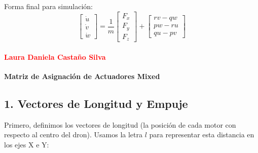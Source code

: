 \documentclass[11pt,a4paper]{article}
\begin{document}
Forma final para simulación:
\begin{equation}
\boxed{
\begin{bmatrix}\dot{u}\\[2pt]\dot{v}\\[2pt]\dot{w}\end{bmatrix}
=\frac{1}{m}\begin{bmatrix}F_{x}\\[2pt]F_{y}\\[2pt]F_{z}\end{bmatrix}
+\begin{bmatrix}rv-qw\\[2pt]pw-ru\\[2pt]qu-pv\end{bmatrix}}
\end{equation}

\paragraph{\textcolor{red} {Laura Daniela Castaño Silva}}
\textbf{Matriz de Asignación de Actuadores Mixed}

\subsection*{1. Vectores de Longitud y Empuje}

Primero, definimos los vectores de longitud (la posición de cada motor con respecto al centro del dron). Usamos la letra $l$ para representar esta distancia en los ejes X e Y:
\end{document}
